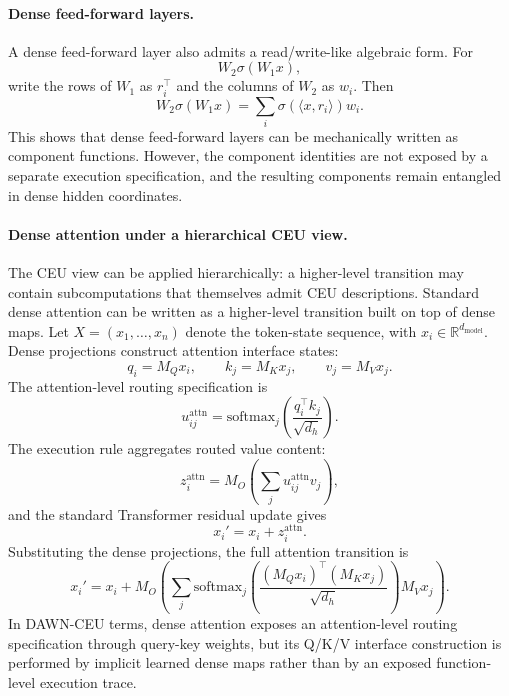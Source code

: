 \documentclass{article}
\begin{document}
\paragraph{Dense feed-forward layers.}
A dense feed-forward layer also admits a read/write-like algebraic form. For
\[
W_2\sigma(W_1x),
\]
write the rows of $W_1$ as $r_i^\top$ and the columns of $W_2$ as $w_i$. Then
\[
W_2\sigma(W_1x)
=
\sum_i \sigma(\langle x,r_i\rangle)w_i.
\]
This shows that dense feed-forward layers can be mechanically written as component functions. However, the component identities are not exposed by a separate execution specification, and the resulting components remain entangled in dense hidden coordinates.

\paragraph{Dense attention under a hierarchical CEU view.}
The CEU view can be applied hierarchically: a higher-level transition may contain subcomputations that themselves admit CEU descriptions. Standard dense attention can be written as a higher-level transition built on top of dense maps. Let \(X=(x_1,\ldots,x_n)\) denote the token-state sequence, with \(x_i\in\mathbb{R}^{d_{\mathrm{model}}}\). Dense projections construct attention interface states:
\[
q_i=M_Qx_i,\qquad k_j=M_Kx_j,\qquad v_j=M_Vx_j.
\]
The attention-level routing specification is
\[
u^{\mathrm{attn}}_{ij}
=
\mathrm{softmax}_j
\left(
\frac{q_i^\top k_j}{\sqrt{d_h}}
\right).
\]
The execution rule aggregates routed value content:
\[
z_i^{\mathrm{attn}}
=
M_O
\left(
\sum_j u^{\mathrm{attn}}_{ij}v_j
\right),
\]
and the standard Transformer residual update gives
\[
x_i' = x_i + z_i^{\mathrm{attn}}.
\]
Substituting the dense projections, the full attention transition is
\[
x_i'
=
x_i+
M_O
\left(
\sum_j
\mathrm{softmax}_j
\left(
\frac{
(M_Qx_i)^\top(M_Kx_j)
}{
\sqrt{d_h}
}
\right)
M_Vx_j
\right).
\]
In DAWN-CEU terms, dense attention exposes an attention-level routing specification through query-key weights, but its Q/K/V interface construction is performed by implicit learned dense maps rather than by an exposed function-level execution trace.
\end{document}
